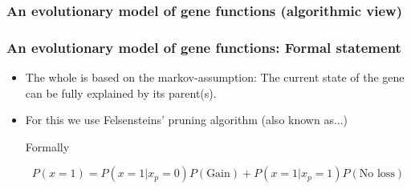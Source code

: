 \documentclass[aspectratio=169, 10pt]{beamer}\usepackage[]{graphicx}\usepackage[]{color}
\begin{document}
\begin{frame}
\frametitle{An evolutionary model of gene functions (algorithmic view)}

\footnotesize

\begin{algorithm}[H]
\SetAlgoLined
{}
\pause
{}
\end{algorithm}

\normalsize

% 
\end{frame}

\begin{frame}
\frametitle{An evolutionary model of gene functions: Formal statement}

\begin{itemize}[<+->]
\item The whole is based on the markov-assumption: The current state of the gene can be
fully explained by its parent(s).

\item For this we use Felsensteins' pruning algorithm (also known as...)

Formally

$$
P(x = 1) = P(x = 1| x_p = 0)P(\mbox{Gain}) + P(x = 1| x_p = 1)P(\mbox{No loss})
$$
\end{itemize}

\end{frame}
\end{document}

